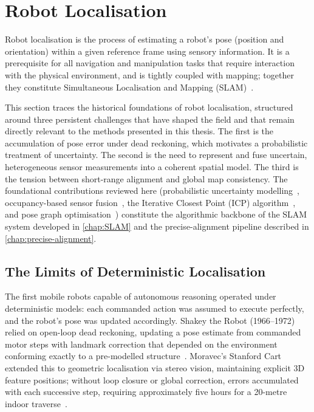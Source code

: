 \section{Robot Localisation}
\label{sec:robot-localisation}

Robot localisation is the process of estimating a robot's pose (position and orientation) within a given reference frame using sensory information. It is a prerequisite for all navigation and manipulation tasks that require interaction with the physical environment, and is tightly coupled with mapping; together they constitute Simultaneous Localisation and Mapping (SLAM)~\cite{ullahMobileRobotLocalization2024,leonardSimultaneousMapBuilding1991}.

This section traces the historical foundations of robot localisation, structured around three persistent challenges that have shaped the field and that remain directly relevant to the methods presented in this thesis. The first is the accumulation of pose error under dead reckoning, which motivates a probabilistic treatment of uncertainty. The second is the need to represent and fuse uncertain, heterogeneous sensor measurements into a coherent spatial model. The third is the tension between short-range alignment and global map consistency. The foundational contributions reviewed here (probabilistic uncertainty modelling~\cite{smithRepresentationEstimationSpatial1987}, occupancy-based sensor fusion~\cite{elfesUsingOccupancyGrids1989}, the Iterative Closest Point (ICP) algorithm~\cite{beslMethodRegistration3D1992a}, and pose graph optimisation~\cite{luGloballyConsistentRange1997}) constitute the algorithmic backbone of the SLAM system developed in \cref{chap:SLAM} and the precise-alignment pipeline described in \cref{chap:precise-alignment}.

\subsection{The Limits of Deterministic Localisation}
\label{subsec:deterministic-localisation}

The first mobile robots capable of autonomous reasoning operated under deterministic models: each commanded action was assumed to execute perfectly, and the robot's pose was updated accordingly. Shakey the Robot (1966--1972) relied on open-loop dead reckoning, updating a pose estimate from commanded motor steps with landmark correction that depended on the environment conforming exactly to a pre-modelled structure~\cite{nilssonShakeyRobot1984}. Moravec's Stanford Cart extended this to geometric localisation via stereo vision, maintaining explicit 3D feature positions; without loop closure or global correction, errors accumulated with each successive step, requiring approximately five hours for a 20-metre indoor traverse~\cite{moravecObstacleAvoidanceNavigatio1980,moravecStanfordCartCMU1990}.

